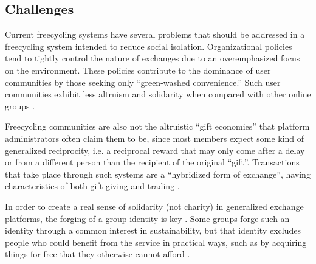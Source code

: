 \subsection*{Challenges}

Current freecycling systems have several problems that should be addressed in a freecycling system intended to reduce social isolation. Organizational policies tend to tightly control the nature of exchanges due to an overemphasized focus on the environment. These policies contribute to the dominance of user communities by those seeking only ``green-washed convenience.'' Such user communities exhibit less altruism and solidarity when compared with other online groups \cite{aptekar_gifts_2016}.

Freecycling communities are also not the altruistic ``gift economies'' that platform administrators often claim them to be, since most members expect some kind of generalized reciprocity, i.e. a reciprocal reward that may only come after a delay or from a different person than the recipient of the original ``gift''. Transactions that take place through such systems are a ``hybridized form of exchange'', having characteristics of both gift giving and trading \cite{arsel_hybrid_2011}.

In order to create a real sense of solidarity (not charity) in generalized exchange platforms, the forging of a group identity is key \cite{willer_structure_2012}. Some groups forge such an identity through a common interest in sustainability, but that identity excludes people who could benefit from the service in practical ways, such as by acquiring things for free that they otherwise cannot afford \cite{aptekar_gifts_2016}.
